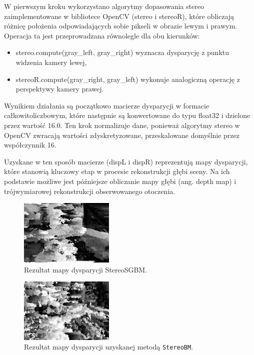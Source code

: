 \documentclass[magisterska]{pracadypl}
\begin{document}
W pierwszym kroku wykorzystano algorytmy dopasowania stereo zaimplementowane w bibliotece OpenCV (stereo i stereoR), które obliczają różnicę położenia odpowiadających sobie pikseli w obrazie lewym i prawym. Operacja ta jest przeprowadzana równolegle dla obu kierunków:

\begin{itemize}
  \item stereo.compute(gray\_left, gray\_right) wyznacza dysparycję z punktu widzenia kamery lewej,
  \item stereoR.compute(gray\_right, gray\_left) wykonuje analogiczną operację z perspektywy kamery prawej.
\end{itemize}

Wynikiem działania są początkowo macierze dysparycji w formacie całkowitoliczbowym, które następnie są konwertowane do typu float32 i dzielone przez wartość 16.0. Ten krok normalizuje dane, ponieważ algorytmy stereo w OpenCV zwracają wartości zdyskretyzowane, przeskalowane domyślnie przez współczynnik 16.

Uzyskane w ten sposób macierze (dispL i dispR) reprezentują mapy dysparycji, które stanowią kluczowy etap w procesie rekonstrukcji głębi sceny. Na ich podstawie możliwe jest późniejsze obliczanie mapy głębi (ang. depth map) i trójwymiarowej rekonstrukcji obserwowanego otoczenia.

\begin{figure}[H]
\centering
\includegraphics[width=0.4\textwidth]{images/disparity.png}
\captionsetup{font=footnotesize}
\caption[Rezultat mapy dysparycji StereoSGBM. Opracowanie własne.]{Rezultat mapy dysparycji StereoSGBM.}
\end{figure}

\begin{figure}[H]
    \centering
    \includegraphics[width=0.4\textwidth]{images/BMdisparity.png}
    \captionsetup{font=footnotesize}
    \caption[Rezultat mapy dysparycji StereoBM. Opracowanie własne.]{Rezultat mapy dysparycji uzyskanej metodą \texttt{StereoBM}.}
\end{figure}
\end{document}

